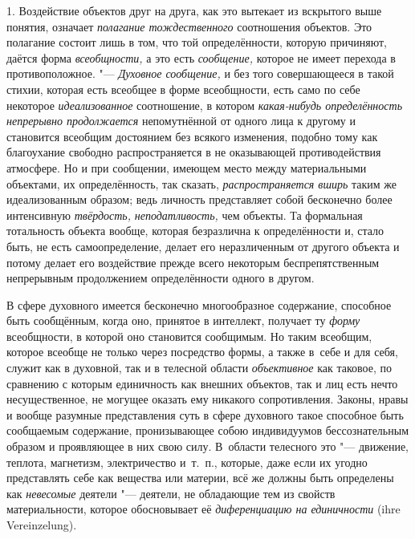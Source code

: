 1. Воздействие объектов друг на друга, как это вытекает из
вскрытого выше понятия, означает
{\em полагание тождественного}
соотношения объектов. Это полагание состоит лишь в том, что
той определённости, которую
причиняют,
даётся форма
{\em всеобщности,} а это
есть {\em сообщение,}
которое не имеет перехода в противоположное. "---
{\em Духовное сообщение,}
и без того совершающееся в такой стихии, которая есть
всеобщее в форме всеобщности, есть само по себе некоторое
{\em идеализованное}
соотношение, в котором
{\em какая-нибудь определённость
непрерывно продолжается} непомутнённой от одного лица к
другому и становится всеобщим достоянием без всякого изменения, подобно
тому как благоухание свободно распространяется в не оказывающей
противодействия атмосфере. Но и при сообщении, имеющем место между
материальными объектами, их определённость, так сказать,
{\em распространяется вширь}
таким же идеализованным образом; ведь личность представляет
собой бесконечно более интенсивную
{\em твёрдость,}{\em
неподатливость,} чем объекты. Та формальная
тотальность объекта вообще, которая безразлична к определённости и, стало
быть, не есть самоопределение, делает его неразличенным от другого объекта
и потому делает его воздействие прежде всего некоторым беспрепятственным
непрерывным продолжением определённости одного в другом.

В сфере духовного имеется бесконечно многообразное содержание,
способное быть сообщённым, когда оно, принятое в интеллект, получает ту
{\em форму} всеобщности,
в которой оно становится сообщимым. Но таким всеобщим, которое всеобще не
только через посредство формы, а также в~себе и для себя, служит как в
духовной, так и в телесной области
{\em объективное} как
таковое, по сравнению с которым единичность как внешних объектов, так и лиц
есть нечто несущественное, не могущее оказать ему никакого сопротивления.
Законы, нравы и вообще разумные представления суть в сфере духовного такое
способное быть сообщаемым содержание, пронизывающее собою индивидуумов
бессознательным образом и проявляющее в них свою силу. В~области телесного
это "--- движение, теплота, магнетизм, электричество и~т.~п.,
которые, даже если их угодно представлять себе как вещества или материи,
всё же должны быть определены как
{\em невесомые} деятели
"--- деятели, не обладающие тем из свойств материальности,
которое обосновывает её
{\em диференциацию на единичности} (ihre Verein\-zelung).

